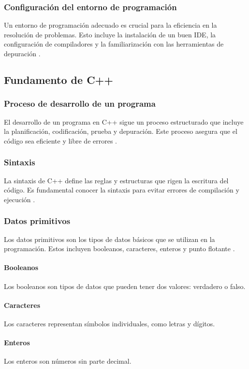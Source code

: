 \subsubsection{Configuración del entorno de programación}
Un entorno de programación adecuado es crucial para la eficiencia en la resolución de problemas. Esto incluye la instalación de un buen IDE, la configuración de compiladores y la familiarización con las herramientas de depuración \cite{gaddis2018starting}.

\subsection{Fundamento de C++}
\subsubsection{Proceso de desarrollo de un programa}
El desarrollo de un programa en C++ sigue un proceso estructurado que incluye la planificación, codificación, prueba y depuración. Este proceso asegura que el código sea eficiente y libre de errores \cite{stroustrup2013c++}.

\subsubsection{Sintaxis}
La sintaxis de C++ define las reglas y estructuras que rigen la escritura del código. Es fundamental conocer la sintaxis para evitar errores de compilación y ejecución \cite{stroustrup2013c++}.

\subsubsection{Datos primitivos}
Los datos primitivos son los tipos de datos básicos que se utilizan en la programación. Estos incluyen booleanos, caracteres, enteros y punto flotante \cite{gaddis2018starting}.
\paragraph{Booleanos}
Los booleanos son tipos de datos que pueden tener dos valores: verdadero o falso.
\paragraph{Caracteres}
Los caracteres representan símbolos individuales, como letras y dígitos.
\paragraph{Enteros}
Los enteros son números sin parte decimal.
